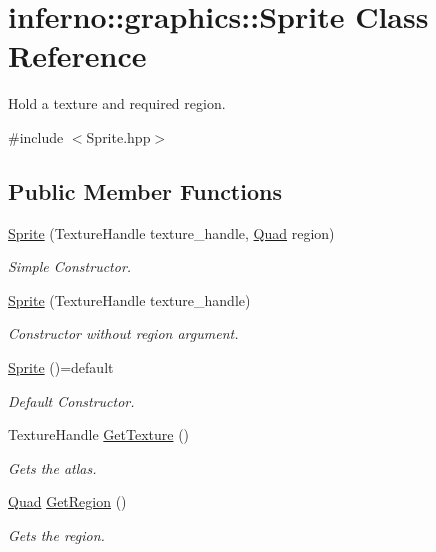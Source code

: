\hypertarget{classinferno_1_1graphics_1_1_sprite}{}\section{inferno\+:\+:graphics\+:\+:Sprite Class Reference}
\label{classinferno_1_1graphics_1_1_sprite}


Hold a texture and required region.  




{\ttfamily \#include $<$Sprite.\+hpp$>$}

\subsection*{Public Member Functions}
\begin{DoxyCompactItemize}
\item 
\mbox{\hyperlink{classinferno_1_1graphics_1_1_sprite_a404b45a087a04018e5e2bc5c7b59ab67}{Sprite}} (Texture\+Handle texture\+\_\+handle, \mbox{\hyperlink{classinferno_1_1graphics_1_1_rectangle}{Quad}} region)
\begin{DoxyCompactList}\small\item\em Simple Constructor. \end{DoxyCompactList}\item 
\mbox{\hyperlink{classinferno_1_1graphics_1_1_sprite_a8673ad1ca45d867e83355a1ad10b752a}{Sprite}} (Texture\+Handle texture\+\_\+handle)
\begin{DoxyCompactList}\small\item\em Constructor without region argument. \end{DoxyCompactList}\item 
\mbox{\label{classinferno_1_1graphics_1_1_sprite_a32f2beb808b266795f985315762e0446}} 
\mbox{\hyperlink{classinferno_1_1graphics_1_1_sprite_a32f2beb808b266795f985315762e0446}{Sprite}} ()=default
\begin{DoxyCompactList}\small\item\em Default Constructor. \end{DoxyCompactList}\item 
Texture\+Handle \mbox{\hyperlink{classinferno_1_1graphics_1_1_sprite_a289d0e72752f3606116c75442a710e61}{Get\+Texture}} ()
\begin{DoxyCompactList}\small\item\em Gets the atlas. \end{DoxyCompactList}\item 
\mbox{\hyperlink{classinferno_1_1graphics_1_1_rectangle}{Quad}} \mbox{\hyperlink{classinferno_1_1graphics_1_1_sprite_ad2f468c9390d0d952f049daba69ef53f}{Get\+Region}} ()
\begin{DoxyCompactList}\small\item\em Gets the region. \end{DoxyCompactList}\end{DoxyCompactItemize}


